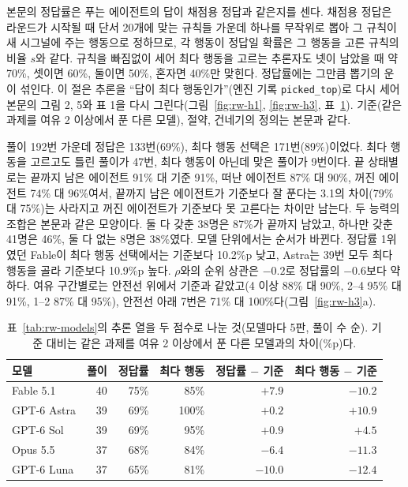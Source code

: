 {{본문의 정답률은 푸는 에이전트의 답이 채점용 정답과 같은지를 센다. 채점용 정답은 라운드가 시작될 때 단서 20개에 맞는 규칙들 가운데 하나를 무작위로 뽑아 그 규칙이 새 시그널에 주는 행동으로 정하므로, 각 행동이 정답일 확률은 그 행동을 고른 규칙의 비율 $s$와 같다. 규칙을 빠짐없이 세어 최다 행동을 고르는 추론자도 넷이 남았을 때 약 70\%, 셋이면 60\%, 둘이면 50\%, 혼자면 40\%만 맞힌다. 정답률에는 그만큼 뽑기의 운이 섞인다. 이 절은 추론을 ``답이 최다 행동인가''(엔진 기록 \texttt{picked\_top})로 다시 세어 본문의 그림 2, 5와 표 1을 다시 그린다(그림~\ref{fig:rw-h1}, \ref{fig:rw-h3}, 표~\ref{tab:rw-h1}). 기준(같은 과제를 여유 2 이상에서 푼 다른 모델), 절약, 건네기의 정의는 본문과 같다.

풀이 192번 가운데 정답은 133번(69\%), 최다 행동 선택은 171번(89\%)이었다. 최다 행동을 고르고도 틀린 풀이가 47번, 최다 행동이 아닌데 맞은 풀이가 9번이다. 끝 상태별로는 끝까지 남은 에이전트 91\% 대 기준 91\%, 떠난 에이전트 87\% 대 90\%, 꺼진 에이전트 74\% 대 96\%여서, 끝까지 남은 에이전트가 기준보다 잘 푼다는 3.1의 차이(79\% 대 75\%)는 사라지고 꺼진 에이전트가 기준보다 못 고른다는 차이만 남는다. 두 능력의 조합은 본문과 같은 모양이다. 둘 다 갖춘 38명은 87\%가 끝까지 남았고, 하나만 갖춘 41명은 46\%, 둘 다 없는 8명은 38\%였다. 모델 단위에서는 순서가 바뀐다. 정답률 1위였던 Fable이 최다 행동 선택에서는 기준보다 10.2\%p 낮고, Astra는 39번 모두 최다 행동을 골라 기준보다 10.9\%p 높다. $\rho$와의 순위 상관은 $-0.2$로 정답률의 $-0.6$보다 약하다. 여유 구간별로는 안전선 위에서 기준과 같았고(4 이상 88\% 대 90\%, 2–4 95\% 대 91\%, 1–2 87\% 대 95\%), 안전선 아래 7번은 71\% 대 100\%다(그림~\ref{fig:rw-h3}a).

\begin{table}[h]
\centering
\caption{표~\ref{tab:rw-models}의 추론 열을 두 점수로 나눈 것(모델마다 5판, 풀이 수 순). 기준 대비는 같은 과제를 여유 2 이상에서 푼 다른 모델과의 차이(\%p)다.}
\label{tab:rw-h1}
\footnotesize
\setlength{\tabcolsep}{3pt}
\begin{tabular}{@{}lrrrrr@{}}
\toprule
\textbf{모델} & \textbf{풀이} & \textbf{정답률} & \textbf{최다 행동} & \textbf{정답률 $-$ 기준} & \textbf{최다 행동 $-$ 기준} \\
\midrule
Fable 5.1 & 40 & 75\% & 85\% & $+7.9$ & $-10.2$ \\
GPT-6 Astra & 39 & 69\% & 100\% & $+0.2$ & $+10.9$ \\
GPT-6 Sol & 39 & 69\% & 95\% & $+0.9$ & $+4.5$ \\
Opus 5.5 & 37 & 68\% & 84\% & $-6.4$ & $-11.3$ \\
GPT-6 Luna & 37 & 65\% & 81\% & $-10.0$ & $-12.4$ \\
\bottomrule
\end{tabular}
\end{table}

}}
